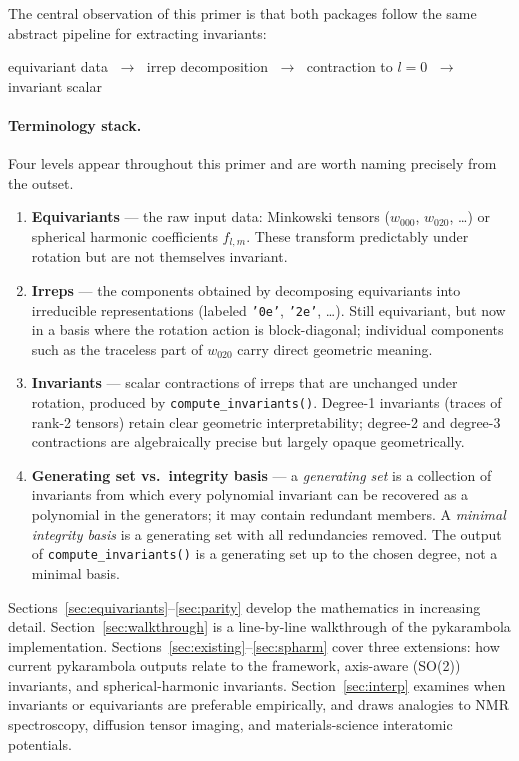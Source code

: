 \documentclass[11pt,a4paper]{article}
\begin{document}
The central observation of this primer is that both packages follow the same
abstract pipeline for extracting invariants:

\medskip
\centerline{equivariant data
  $\;\longrightarrow\;$ irrep decomposition
  $\;\longrightarrow\;$ contraction to $l=0$
  $\;\longrightarrow\;$ invariant scalar}
\medskip

\paragraph{Terminology stack.}
Four levels appear throughout this primer and are worth naming precisely from the outset.
\begin{enumerate}
  \item \textbf{Equivariants} — the raw input data: Minkowski tensors
        ($w_{000}$, $w_{020}$, \ldots) or spherical harmonic coefficients $f_{l,m}$.
        These transform predictably under rotation but are not themselves invariant.
  \item \textbf{Irreps} — the components obtained by decomposing equivariants into
        irreducible representations (labeled \texttt{'0e'}, \texttt{'2e'}, \ldots).
        Still equivariant, but now in a basis where the rotation action is block-diagonal;
        individual components such as the traceless part of $w_{020}$ carry direct geometric meaning.
  \item \textbf{Invariants} — scalar contractions of irreps that are unchanged under
        rotation, produced by \texttt{compute\_invariants()}.
        Degree-1 invariants (traces of rank-2 tensors) retain clear geometric interpretability;
        degree-2 and degree-3 contractions are algebraically precise but largely opaque geometrically.
  \item \textbf{Generating set vs.\ integrity basis} — a \emph{generating set} is a
        collection of invariants from which every polynomial invariant can be recovered as a
        polynomial in the generators; it may contain redundant members.
        A \emph{minimal integrity basis} is a generating set with all redundancies removed.
        The output of \texttt{compute\_invariants()} is a generating set up to the chosen
        degree, not a minimal basis.
\end{enumerate}

\noindent
Sections~\ref{sec:equivariants}--\ref{sec:parity} develop the mathematics in
increasing detail.
Section~\ref{sec:walkthrough} is a line-by-line walkthrough of the pykarambola
implementation.
Sections~\ref{sec:existing}--\ref{sec:spharm} cover three extensions:
how current pykarambola outputs relate to the framework, axis-aware (SO(2))
invariants, and spherical-harmonic invariants.
Section~\ref{sec:interp} examines when invariants or equivariants are preferable
empirically, and draws analogies to NMR spectroscopy, diffusion tensor imaging,
and materials-science interatomic potentials.
\end{document}
